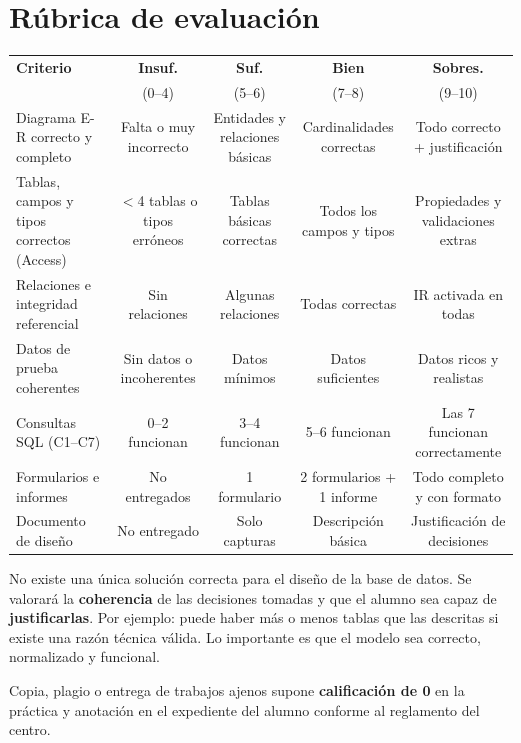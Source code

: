 \documentclass[12pt,a4paper]{article}
\begin{document}
\vspace{0.4cm}

\section{Rúbrica de evaluación}

\renewcommand{\arraystretch}{1.4}
\begin{tabularx}{\linewidth}{@{}X c c c c@{}}
  \toprule
  \textbf{Criterio} & \textbf{Insuf.} & \textbf{Suf.} & \textbf{Bien} & \textbf{Sobres.} \\
   & \small(0--4) & \small(5--6) & \small(7--8) & \small(9--10) \\
  \midrule
  Diagrama E-R correcto y completo
    & Falta o muy incorrecto & Entidades y relaciones básicas & Cardinalidades correctas
    & Todo correcto + justificación \\
  \addlinespace
  Tablas, campos y tipos correctos (Access)
    & $<$4 tablas o tipos erróneos & Tablas básicas correctas & Todos los campos y tipos
    & Propiedades y validaciones extras \\
  \addlinespace
  Relaciones e integridad referencial
    & Sin relaciones & Algunas relaciones & Todas correctas & IR activada en todas \\
  \addlinespace
  Datos de prueba coherentes
    & Sin datos o incoherentes & Datos mínimos & Datos suficientes & Datos ricos y realistas \\
  \addlinespace
  Consultas SQL (C1--C7)
    & 0--2 funcionan & 3--4 funcionan & 5--6 funcionan & Las 7 funcionan correctamente \\
  \addlinespace
  Formularios e informes
    & No entregados & 1 formulario & 2 formularios + 1 informe & Todo completo y con formato \\
  \addlinespace
  Documento de diseño
    & No entregado & Solo capturas & Descripción básica & Justificación de decisiones \\
  \bottomrule
\end{tabularx}

\vspace{0.5cm}

\begin{notabox}
No existe una única solución correcta para el diseño de la base de datos. Se valorará la
\textbf{coherencia} de las decisiones tomadas y que el alumno sea capaz de \textbf{justificarlas}.
Por ejemplo: puede haber más o menos tablas que las descritas si existe una razón técnica válida.
Lo importante es que el modelo sea correcto, normalizado y funcional.

\medskip
Copia, plagio o entrega de trabajos ajenos supone \textbf{calificación de 0} en la práctica
y anotación en el expediente del alumno conforme al reglamento del centro.
\end{notabox}
\end{document}
